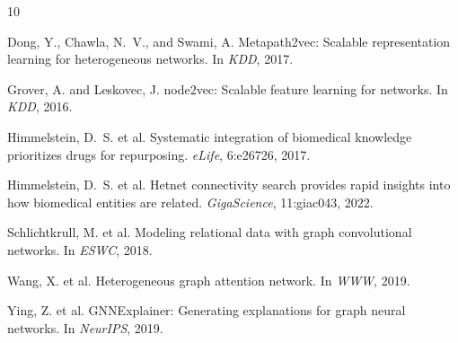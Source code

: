 \documentclass{article}
\begin{document}
\begin{thebibliography}{10}

Dong, Y., Chawla, N.~V., and Swami, A.
\newblock Metapath2vec: Scalable representation learning for heterogeneous networks.
\newblock In \emph{KDD}, 2017.

Grover, A. and Leskovec, J.
\newblock node2vec: Scalable feature learning for networks.
\newblock In \emph{KDD}, 2016.

Himmelstein, D.~S. et al.
\newblock Systematic integration of biomedical knowledge prioritizes drugs for repurposing.
\newblock \emph{eLife}, 6:e26726, 2017.

Himmelstein, D.~S. et al.
\newblock Hetnet connectivity search provides rapid insights into how biomedical entities are related.
\newblock \emph{GigaScience}, 11:giac043, 2022.

Schlichtkrull, M. et al.
\newblock Modeling relational data with graph convolutional networks.
\newblock In \emph{ESWC}, 2018.

Wang, X. et al.
\newblock Heterogeneous graph attention network.
\newblock In \emph{WWW}, 2019.

Ying, Z. et al.
\newblock GNNExplainer: Generating explanations for graph neural networks.
\newblock In \emph{NeurIPS}, 2019.

\end{thebibliography}
\end{document}
